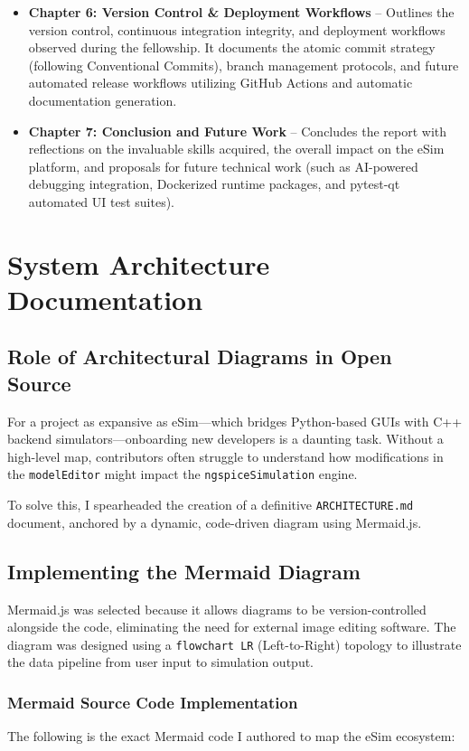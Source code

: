 \documentclass[12pt,a4paper]{report}
\begin{document}
\begin{itemize}
    \item \textbf{Chapter 6: Version Control \& Deployment Workflows} -- Outlines the version control, continuous integration integrity, and deployment workflows observed during the fellowship. It documents the atomic commit strategy (following Conventional Commits), branch management protocols, and future automated release workflows utilizing GitHub Actions and automatic documentation generation.
    \item \textbf{Chapter 7: Conclusion and Future Work} -- Concludes the report with reflections on the invaluable skills acquired, the overall impact on the eSim platform, and proposals for future technical work (such as AI-powered debugging integration, Dockerized runtime packages, and pytest-qt automated UI test suites).
\end{itemize}

\chapter{System Architecture Documentation}
\section{Role of Architectural Diagrams in Open Source}
For a project as expansive as eSim—which bridges Python-based GUIs with C++ backend simulators—onboarding new developers is a daunting task. Without a high-level map, contributors often struggle to understand how modifications in the \texttt{modelEditor} might impact the \texttt{ngspiceSimulation} engine. 

To solve this, I spearheaded the creation of a definitive \texttt{ARCHITECTURE.md} document, anchored by a dynamic, code-driven diagram using Mermaid.js.

\section{Implementing the Mermaid Diagram}
Mermaid.js was selected because it allows diagrams to be version-controlled alongside the code, eliminating the need for external image editing software. The diagram was designed using a \texttt{flowchart LR} (Left-to-Right) topology to illustrate the data pipeline from user input to simulation output.

\subsection{Mermaid Source Code Implementation}
The following is the exact Mermaid code I authored to map the eSim ecosystem:
\end{document}
